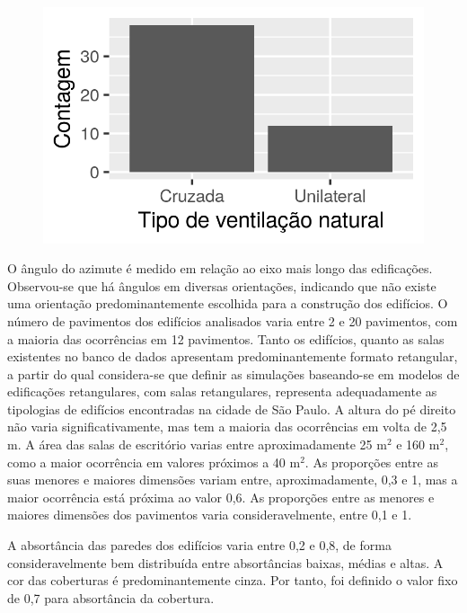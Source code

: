 \documentclass[brazil,hardcopy,openany]{ufscthesis} %
\begin{document}
\begin{figure}[H]
\begin{minipage}{.33\textwidth}
	\end{minipage}
	\begin{minipage}{.33\textwidth}
		\includegraphics[width=\linewidth]{img/hist_tipo_vn.png}
	\end{minipage}
\end{figure}
\newpage

O ângulo do azimute é medido em relação ao eixo mais longo das edificações. Observou-se que há ângulos em diversas orientações, indicando que não existe uma orientação predominantemente escolhida para a construção dos edifícios.
O número de pavimentos dos edifícios analisados varia entre 2 e 20 pavimentos, com a maioria das ocorrências em 12 pavimentos.
Tanto os edifícios, quanto as salas existentes no banco de dados apresentam predominantemente formato retangular, a partir do qual considera-se que definir as simulações baseando-se em modelos de edificações retangulares, com salas retangulares, representa adequadamente as tipologias de edifícios encontradas na cidade de São Paulo.
A altura do pé direito não varia significativamente, mas tem a maioria das ocorrências em volta de 2,5 m.
A área das salas de escritório varias entre aproximadamente 25 m$^2$ e 160 m$^2$, como a maior ocorrência em valores próximos a 40 m$^2$.
As proporções entre as suas menores e maiores dimensões variam entre, aproximadamente, 0,3 e 1, mas a maior ocorrência está próxima ao valor 0,6.
As proporções entre as menores e maiores dimensões dos pavimentos varia consideravelmente, entre 0,1 e 1.

A absortância das paredes dos edifícios varia entre 0,2 e 0,8, de forma consideravelmente bem distribuída entre absortâncias baixas, médias e altas. A cor das coberturas é predominantemente cinza. Por tanto, foi definido o valor fixo de 0,7 para absortância da cobertura.
\end{document}
